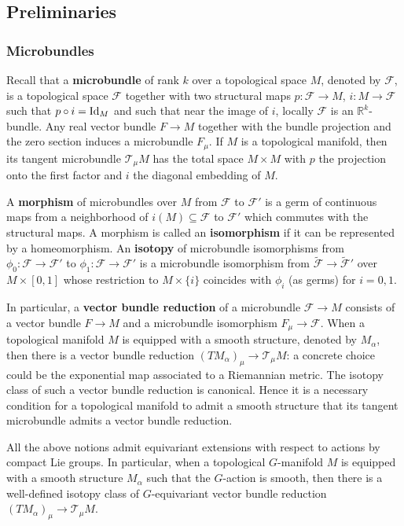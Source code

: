 \documentclass[reqno, 10pt]{amsart}
\numberwithin{equation}{section}
\numberwithin{equation}{section}
\renewcommand{\subset}{\subseteq}
\theoremstyle{definition}
\theoremstyle{remark}
\newcommand{\mb}{\mathbb}
\newcommand{\ms}{\mathscr}
\begin{document}
\subsection{Preliminaries}

\subsubsection{Microbundles}

Recall that a {\bf microbundle} of rank $k$ over a topological space   $M$, denoted by ${\ms F}$, is a topological space ${\ms F}$ together with two structural maps $p: {\ms F} \to M$, $i: M\to {\ms F}$ such that $p\circ i = {\rm Id}_M$ and such that near the image of $i$, locally ${\ms F}$ is an ${\mb R}^k$-bundle. Any real vector bundle $F \to M$ together with the bundle projection and the zero section induces a microbundle $F_\mu$. If $M$ is a topological manifold, then its tangent microbundle ${\ms T}_\mu M$ has the total space $M \times M$ with $p$ the projection onto the first factor and $i$ the diagonal embedding of $M$.

A {\bf morphism} of microbundles over $M$ from ${\ms F}$ to ${\ms F}'$ is a germ of continuous maps from a neighborhood of $i(M) \subset {\ms F}$ to ${\ms F}'$ which commutes with the structural maps. A morphism is called an {\bf isomorphism} if it can be represented by a homeomorphism. An {\bf isotopy} of microbundle isomorphisms from $\phi_0: {\ms F} \to {\ms F}'$ to $\phi_1: {\ms F} \to {\ms F}'$ is a microbundle isomorphism from $\tilde {\ms F} \to \tilde {\ms F}'$ over $M \times [0, 1]$ whose restriction to $M\times \{i\}$ coincides with $\phi_i$ (as germs) for $i = 0, 1$.

In particular, a {\bf vector bundle reduction} of a microbundle ${\ms F} \to M$ consists of a vector bundle $F \to M$ and a microbundle isomorphism $F_\mu \to {\ms F}$. When a topological manifold $M$ is equipped with a smooth structure, denoted by $M_\alpha$, then there is a vector bundle reduction $(TM_\alpha)_\mu \to {\ms T}_\mu M$: a concrete choice could be the exponential map associated to a Riemannian metric. The isotopy class of such a vector bundle reduction is canonical. Hence it is a necessary condition for a topological manifold to admit a smooth structure that its tangent microbundle admits a vector bundle reduction. 

All the above notions admit equivariant extensions with respect to actions by compact Lie groups. In particular, when a topological $G$-manifold $M$ is equipped with a smooth structure $M_\alpha$ such that the $G$-action is smooth, then there is a well-defined isotopy class of $G$-equivariant vector bundle reduction $(TM_\alpha)_\mu \to {\ms T}_\mu M$.
\end{document}
